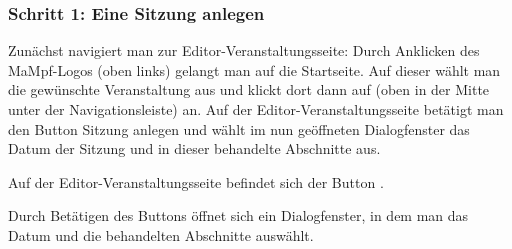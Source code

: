 \documentclass[parskip=off,index=totocnumbered]{scrartcl}
\newenvironment{rückkeinstück}
	{\begin{adjustwidth}{0cm}{0cm}\footnotesize \singlespace \centering} 
	{\end{adjustwidth} \onehalfspacing}
\newenvironment{rückkeinstück2}
	{\begin{adjustwidth}{0cm}{0cm}\footnotesize \singlespace} 
	{\end{adjustwidth} \onehalfspacing}
\begin{document}
\subsubsection*{Schritt 1: Eine Sitzung anlegen}
Zunächst navigiert man zur Editor-Veranstaltungsseite: Durch Anklicken des MaMpf-Logos (oben links) gelangt man auf die Startseite. Auf dieser wählt man die gewünschte Veranstaltung aus und klickt dort dann auf \edit (oben in der Mitte unter der Navigationsleiste) an. Auf der Editor-Veranstaltungsseite betätigt man den Button \colorbox{LightSteelBlue3!60!}{\textsf{Sitzung anlegen}} und wählt im nun geöffneten Dialogfenster das Datum der Sitzung und in dieser behandelte Abschnitte aus.

\noindent \begin{minipage}{\textwidth}
    \vspace{0.6cm}
    \begin{rückkeinstück}
        Auf der Editor-Veranstaltungsseite befindet sich der Button .
        \vspace{0.6cm}
    \end{rückkeinstück}
\end{minipage}

\noindent \begin{minipage}{\textwidth}
    \begin{rückkeinstück2}
        Durch Betätigen des Buttons  öffnet sich ein Dialogfenster, in dem man das Datum und die behandelten Abschnitte auswählt.
    \end{rückkeinstück2}
\end{minipage}
            
\end{document}
